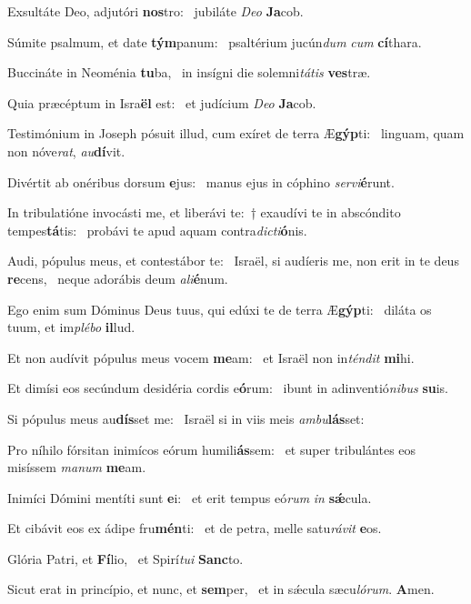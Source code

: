 \item Exsultáte Deo, adjutóri \textbf{nos}tro:~\psstar{} jubiláte \textit{Deo} \textbf{Ja}cob.
\item Súmite psalmum, et date \textbf{tým}panum:~\psstar{} psaltérium jucún\textit{dum} \textit{cum} \textbf{cí}thara.
\item Buccináte in Neoménia \textbf{tu}ba,~\psstar{} in insígni die solemni\textit{tátis} \textbf{ves}træ.
\item Quia præcéptum in Isra\textbf{ël} est:~\psstar{} et judícium \textit{Deo} \textbf{Ja}cob.
\item Testimónium in Joseph pósuit illud, cum exíret de terra Æ\textbf{gýp}ti:~\psstar{} linguam, quam non nóve\textit{rat}, \textit{au}\textbf{dí}vit.
\item Divértit ab onéribus dorsum \textbf{e}jus:~\psstar{} manus ejus in cóphino \textit{servi}\textbf{é}runt.
\item In tribulatióne invocásti me, et liberávi te:~† exaudívi te in abscóndito tempes\textbf{tá}tis:~\psstar{} probávi te apud aquam contra\textit{dicti}\textbf{ó}nis.
\item Audi, pópulus meus, et contestábor te:~\pscross{} Israël, si audíeris me, non erit in te deus \textbf{re}cens,~\psstar{} neque adorábis deum \textit{ali}\textbf{é}num.
\item Ego enim sum Dóminus Deus tuus, qui edúxi te de terra Æ\textbf{gýp}ti:~\psstar{} diláta os tuum, et im\textit{plébo} \textbf{il}lud.
\item Et non audívit pópulus meus vocem \textbf{me}am:~\psstar{} et Israël non in\textit{téndit} \textbf{mi}hi.
\item Et dimísi eos secúndum desidéria cordis e\textbf{ó}rum:~\psstar{} ibunt in adinventió\textit{nibus} \textbf{su}is.
\item Si pópulus meus au\textbf{dís}set me:~\psstar{} Israël si in viis meis \textit{ambu}\textbf{lás}set:
\item Pro níhilo fórsitan inimícos eórum humili\textbf{ás}sem:~\psstar{} et super tribulántes eos misíssem \textit{manum} \textbf{me}am.
\item Inimíci Dómini mentíti sunt \textbf{e}i:~\psstar{} et erit tempus eó\textit{rum} \textit{in} \textbf{sǽ}cula.
\item Et cibávit eos ex ádipe fru\textbf{mén}ti:~\psstar{} et de petra, melle satu\textit{rávit} \textbf{e}os.
\item Glória Patri, et \textbf{Fí}lio,~\psstar{} et Spirí\textit{tui} \textbf{Sanc}to.
\item Sicut erat in princípio, et nunc, et \textbf{sem}per,~\psstar{} et in sǽcula sæcu\textit{lórum}. \textbf{A}men.
